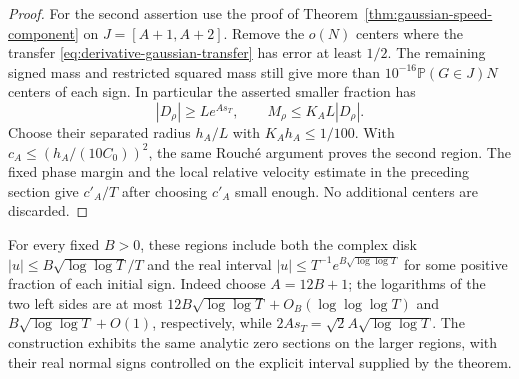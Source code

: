 \begin{proof}
For the second assertion use the proof of
Theorem~\ref{thm:gaussian-speed-component} on $J=[A+1,A+2]$.
Remove the $o(N)$ centers where the transfer
\eqref{eq:derivative-gaussian-transfer} has error at least $1/2$.
The remaining signed mass and restricted squared mass still give
more than $10^{-16}\mathbb P(G\in J)N$ centers of each sign.
In particular the asserted smaller fraction has
\[
              |D_\rho|\ge Le^{As_T},\qquad
              M_\rho\le K_AL|D_\rho|.
\]
Choose their separated radius $h_A/L$ with $K_Ah_A\le1/100$.
With $c_A\le(h_A/(10C_0))^2$, the same Rouch\'e argument proves
the second region. The fixed phase margin and the local relative
velocity estimate in the preceding section give $c'_A/T$ after
choosing $c'_A$ small enough. No additional centers are discarded.
\end{proof}

For every fixed $B>0$, these regions include both the complex disk
$|u|\le B\sqrt{\log\log T}/T$ and the real interval
$|u|\le T^{-1}e^{B\sqrt{\log\log T}}$ for some positive fraction
of each initial sign. Indeed choose $A=12B+1$; the logarithms of the
two left sides are at most $12B\sqrt{\log\log T}+O_B(\log\log\log T)$
and $B\sqrt{\log\log T}+O(1)$, respectively, while
$2As_T=\sqrt2 A\sqrt{\log\log T}$.
The construction exhibits the same analytic zero sections on the
larger regions, with their real normal signs controlled on the
explicit interval supplied by the theorem.
